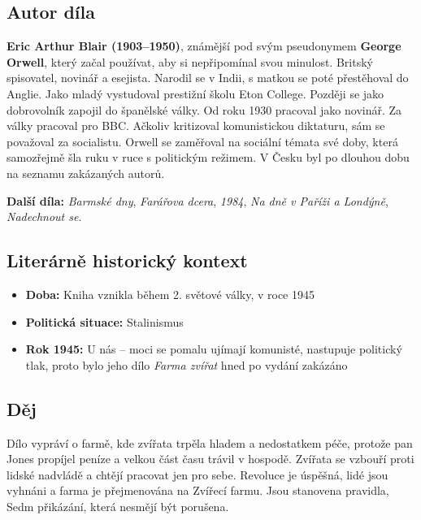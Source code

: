 \documentclass[12pt, a4paper]{article}
\begin{document}
\subsection*{Autor díla}
\textbf{Eric Arthur Blair (1903--1950)}, známější pod svým pseudonymem \textbf{George Orwell}, který začal používat, aby si nepřipomínal svou minulost. Britský spisovatel, novinář a esejista. Narodil se v Indii, s matkou se poté přestěhoval do Anglie. Jako mladý vystudoval prestižní školu Eton College. Později se jako dobrovolník zapojil do španělské války. Od roku 1930 pracoval jako novinář. Za války pracoval pro BBC. Ačkoliv kritizoval komunistickou diktaturu, sám se považoval za socialistu. Orwell se zaměřoval na sociální témata své doby, která samozřejmě šla ruku v ruce s politickým režimem. V Česku byl po dlouhou dobu na seznamu zakázaných autorů.

\textbf{Další díla:} \textit{Barmské dny}, \textit{Farářova dcera}, \textit{1984}, \textit{Na dně v Paříži a Londýně}, \textit{Nadechnout se}.

\subsection*{Literárně historický kontext}
\begin{itemize}[itemsep=0.3em]
	\item \textbf{Doba:} Kniha vznikla během 2. světové války, v roce 1945
	\item \textbf{Politická situace:} Stalinismus
	\item \textbf{Rok 1945:} U nás -- moci se pomalu ujímají komunisté, nastupuje politický tlak, proto bylo jeho dílo \textit{Farma zvířat} hned po vydání zakázáno
\end{itemize}

{\color{subsectioncolor}\hrulefill}
\subsection*{\color{subsectioncolor}Děj}
Dílo vypráví o farmě, kde zvířata trpěla hladem a nedostatkem péče, protože pan Jones propíjel peníze a velkou část času trávil v hospodě. Zvířata se vzbouří proti lidské nadvládě a chtějí pracovat jen pro sebe. Revoluce je úspěšná, lidé jsou vyhnáni a farma je přejmenována na Zvířecí farmu. Jsou stanovena pravidla, Sedm přikázání, která nesmějí být porušena.
\end{document}

